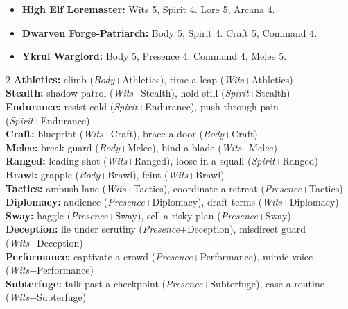 \begin{tcolorbox}[title=Prestige NPCs (Tier IV–V), colback=white!97!gray]
\begin{itemize}
  \item \textbf{High Elf Loremaster:} Wits 5, Spirit 4. Lore 5, Arcana 4.
  \item \textbf{Dwarven Forge‑Patriarch:} Body 5, Spirit 4. Craft 5, Command 4.
  \item \textbf{Ykrul Warglord:} Body 5, Presence 4. Command 4, Melee 5.
\end{itemize}
\end{tcolorbox}

\begin{tcolorbox}[title=Common Rolls (GM Screen Reference), colback=white!97!gray, colframe=black!80!gray]
\begin{multicols}{2}
\textbf{Athletics:} climb (\emph{Body}+Athletics), time a leap (\emph{Wits}+Athletics)\\
\textbf{Stealth:} shadow patrol (\emph{Wits}+Stealth), hold still (\emph{Spirit}+Stealth)\\
\textbf{Endurance:} resist cold (\emph{Spirit}+Endurance), push through pain (\emph{Spirit}+Endurance)\\
\textbf{Craft:} blueprint (\emph{Wits}+Craft), brace a door (\emph{Body}+Craft)\\
\textbf{Melee:} break guard (\emph{Body}+Melee), bind a blade (\emph{Wits}+Melee)\\
\textbf{Ranged:} leading shot (\emph{Wits}+Ranged), loose in a squall (\emph{Spirit}+Ranged)\\
\textbf{Brawl:} grapple (\emph{Body}+Brawl), feint (\emph{Wits}+Brawl)\\
\textbf{Tactics:} ambush lane (\emph{Wits}+Tactics), coordinate a retreat (\emph{Presence}+Tactics)\\
\textbf{Diplomacy:} audience (\emph{Presence}+Diplomacy), draft terms (\emph{Wits}+Diplomacy)\\
\textbf{Sway:} haggle (\emph{Presence}+Sway), sell a risky plan (\emph{Presence}+Sway)\\
\textbf{Deception:} lie under scrutiny (\emph{Presence}+Deception), misdirect guard (\emph{Wits}+Deception)\\
\textbf{Performance:} captivate a crowd (\emph{Presence}+Performance), mimic voice (\emph{Wits}+Performance)\\
\textbf{Subterfuge:} talk past a checkpoint (\emph{Presence}+Subterfuge), case a routine (\emph{Wits}+Subterfuge)\\

\end{multicols}
\end{tcolorbox}
